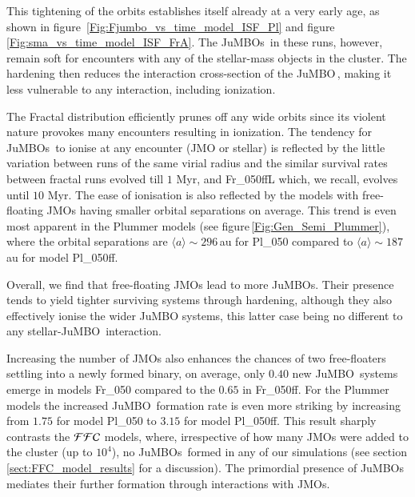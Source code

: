 \documentclass[submission,phys]{lib/SciPost}
\newcommand{\jumbo}{\mbox{JuMBO}}
\newcommand{\jumbos}{\mbox{JuMBOs}}
\begin{document}
This tightening of the orbits establishes itself already at a very early age, as shown in figure\, \ref{Fig:Fjumbo_vs_time_model_ISF_Pl} and figure 
\ref{Fig:sma_vs_time_model_ISF_FrA}.  The \jumbos\,
in these runs, however, remain soft for encounters with any of the
stellar-mass objects in the cluster. The hardening then reduces the
interaction cross-section of the \jumbo\,, making it less vulnerable
to any interaction, including ionization.

The Fractal distribution efficiently prunes off any wide orbits since
its violent nature provokes many encounters resulting in
ionization. The tendency for \jumbos\, to ionise at any encounter (JMO
or stellar) is reflected by the little variation between runs of the
same virial radius and the similar survival rates between fractal runs
evolved till $1$ Myr, and Fr\_050ffL which, we recall, evolves until
$10$ Myr.  The ease of ionisation is also reflected by the models with
free-floating JMOs having smaller orbital separations on average.
This trend is even most apparent in the Plummer models (see
figure\,\ref{Fig:Gen_Semi_Plummer}), where the orbital separations are
$\langle a\rangle\sim296$\,au for Pl\_050 compared to $\langle
a\rangle\sim187$ au for model Pl\_050ff.

Overall, we find that free-floating JMOs lead to more \jumbos.  Their
presence tends to yield tighter surviving systems through hardening,
although they also effectively ionise the wider JuMBO systems, this
latter case being no different to any stellar-\jumbo\ interaction.

Increasing the number of JMOs also enhances the chances of two
free-floaters settling into a newly formed binary, on average, only
$0.40$ new \jumbo\, systems emerge in models Fr\_050 compared to the
$0.65$ in Fr\_050ff. For the Plummer models the increased \jumbo\,
formation rate is even more striking by increasing from $1.75$ for
model Pl\_050 to $3.15$ for model Pl\_050ff.  This result sharply
contrasts the ${\cal FFC}$ models, where, irrespective of how many
JMOs were added to the cluster (up to $10^4$), no \jumbos\, formed in any
of our simulations (see section\,\ref{sect:FFC_model_results} for a
discussion). The primordial presence of \jumbos\, mediates their
further formation through interactions with JMOs.
\end{document}
